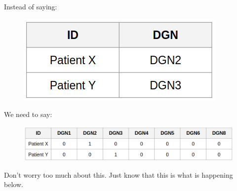\documentclass[11pt]{article}
\makeatletter
\def\maxwidth{\ifdim\Gin@nat@width>\linewidth\linewidth
    \else\Gin@nat@width\fi}
\let\Oldincludegraphics\includegraphics
\renewcommand{\includegraphics}[1]{\Oldincludegraphics[width=.8\maxwidth]{#1}}
\makeatother
\begin{document}
Instead of saying:

\begin{figure}
\centering
\includegraphics{../data/img/encoding_before.png}
\caption{}
\end{figure}

We need to say:

\begin{figure}
\centering
\includegraphics{../data/img/encoding_after.png}
\caption{}
\end{figure}

Don't worry too much about this. Just know that this is what is
happening below.
\end{document}
